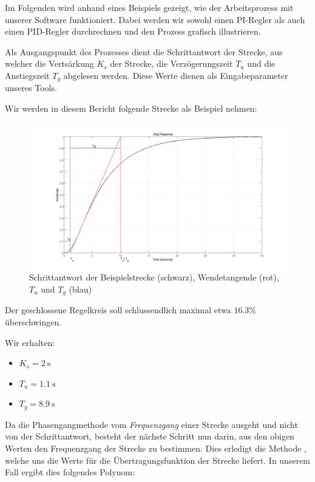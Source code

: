 Im Folgenden wird  anhand eines Beispiels gezeigt, wie  der Arbeitsprozess mit
unserer  Software funktioniert. Dabei  werden wir  sowohl einen  PI-Regler als
auch einen PID-Regler durchrechnen und den Prozess grafisch illustrieren.

Als  Ausgangspunkt  des  Prozesses   dient  die  Schrittantwort  der  Strecke,
aus  welcher  die  Verts\"arkung  $K_s$ der  Strecke,  die  Verz\"ogerungszeit
$T_u$  und die  Anstiegszeit $T_g$  abgelesen werden. Diese  Werte dienen  als
Eingabeparameter unseres Tools.

Wir werden in diesem Bericht folgende Strecke als Beispiel nehmen:
\begin{figure}[h! width=\pagewidth]
    \includegraphics[width=\textwidth]{images/streckeSchrittantwort.png}
    \caption{%
    Schrittantwort der  Beispielstrecke (schwarz), Wendetangende  (rot), $T_u$
    und $T_g$ (blau)%
    }
    \label{fig:plant_step}
\end{figure}

Der  geschlossene   Regelkreis  soll  schlussendlich  maximal   etwa  $16.3\%$
\"uberschwingen.

Wir erhalten:
\begin{itemize}
    \item
        $K_s = \SI{2}{\second}$
    \item
        $T_u = \SI{1.1}{\second}$
    \item
        $T_g = \SI{8.9}{\second}$
\end{itemize}

Da  die Phasengangmethode  vom {\em{Frequenzgang}}  einer Strecke  ausgeht und
nicht von der Schrittantwort, besteht der n\"achste Schritt nun darin, aus den
obigen Werten  den Frequenzgang  der Strecke  zu bestimmen. Dies  erledigt die
Methode , welche uns  die Werte f\"ur die \"Ubertragungsfunktion
der  Strecke   liefert.     In  unserem  Fall  ergibt  dies  folgendes
Polynom:

